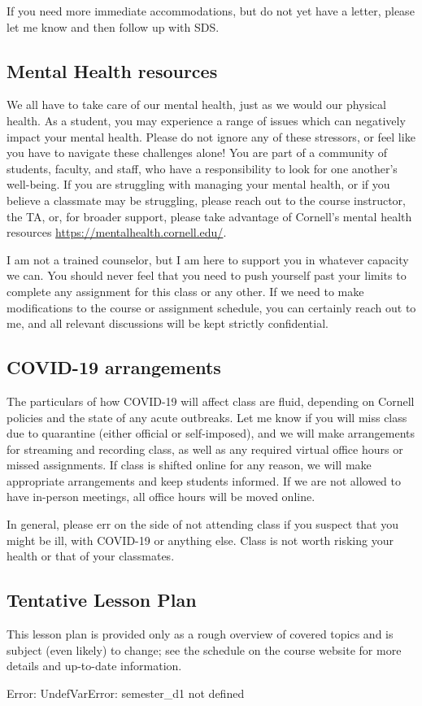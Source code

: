 \documentclass[12pt,a4paper]{article}
\begin{document}
If you need more immediate accommodations, but do not yet have a letter, please let me know and then follow up with SDS.

\subsection{Mental Health resources}
We all have to take care of our mental health, just as we would our physical health. As a student, you may experience a range of issues which can negatively impact your mental health. Please do not ignore any of these stressors, or feel like you have to navigate these challenges alone! You are part of a community of students, faculty, and staff, who have a responsibility to look for one another's well-being. If you are struggling with managing your mental health, or if you believe a classmate may be struggling, please reach out to the course instructor, the TA, or, for broader support, please take advantage of Cornell's mental health resources \href{https://mentalhealth.cornell.edu/}{https://mentalhealth.cornell.edu/}.

I am not a trained counselor, but I am here to support you in whatever capacity we can. You should never feel that you need to push yourself past your limits to complete any assignment for this class or any other. If we need to make modifications to the course or assignment schedule, you can certainly reach out to me, and all relevant discussions will be kept strictly confidential.

\subsection{COVID-19 arrangements}
The particulars of how COVID-19 will affect class are fluid, depending on Cornell policies and the state of any acute outbreaks. Let me know if you will miss class due to quarantine (either official or self-imposed), and we will make arrangements for streaming and recording class, as well as any required virtual office hours or missed assignments. If class is shifted online for any reason, we will make appropriate arrangements and keep students informed. If we are not allowed to have in-person meetings, all office hours will be moved online.

In general, please err on the side of not attending class if you suspect that you might be ill, with COVID-19 or anything else. Class is not worth risking your health or that of your classmates.

\subsection{Tentative Lesson Plan}
This lesson plan is provided only as a rough overview of covered topics and is subject (even likely) to change; see the schedule on the course website for more details and up-to-date information.


Error: UndefVarError: semester_d1 not defined
\end{document}
